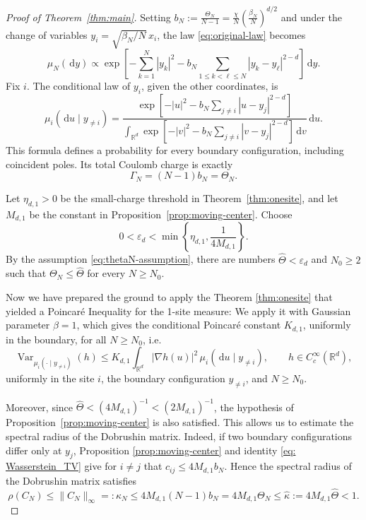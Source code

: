\documentclass[12pt,reqno,letterpaper]{amsart}
\theoremstyle{definition}
\theoremstyle{remark}
\numberwithin{equation}{section}
\newcommand{\R}{\mathbb R}
\newcommand{\dd}{\,\mathrm d}
\newcommand{\be}{\beta}
\newcommand{\Var}{\operatorname{Var}}
\begin{document}
\begin{proof}[Proof of Theorem~\ref{thm:main}]
Setting  $b_N:=\frac{\Theta_N}{N-1}
 =\frac{\chi}{N}\left(\frac{\be_N}{N}\right)^{d/2}$ and 
under the change of variables \(y_i=\sqrt{\be_N/N}\,x_i\), the law 
\eqref{eq:original-law} becomes
\[
 \mu_N(\dd y)
 \propto
 \exp\!\left[-\sum_{k=1}^N|y_k|^2
 -b_N\sum_{1\le k<\ell\le N}|y_k-y_\ell|^{2-d}\right]\dd y.
\]
Fix \(i\).  The conditional law of \(y_i\), given the other coordinates, is
\[
 \mu_i(\dd u\mid y_{\ne i})
 =\frac{\exp\!\left[-|u|^2-b_N\sum_{j\ne i}|u-y_j|^{2-d}\right]}
 {\displaystyle\int_{\R^d}
  \exp\!\left[-|v|^2-b_N\sum_{j\ne i}|v-y_j|^{2-d}\right]\dd v}\dd u.
\]
This formula defines a probability for every boundary configuration,
including coincident poles.  Its total Coulomb charge is exactly
\begin{equation}\label{eq:thetaN-total-charge}
 \Gamma_N=(N-1)b_N=\Theta_N.
\end{equation}

Let \(\eta_{d,1}>0\) be the small-charge threshold in
Theorem~\ref{thm:onesite}, and let \(M_{d,1}\) be the constant in
Proposition~\ref{prop:moving-center}.  Choose
\begin{equation}\label{eq:epsilon-d-choice}
 0<\varepsilon_d<
 \min\left\{\eta_{d,1},\frac{1}{4M_{d,1}}\right\}.
\end{equation}
By the assumption \eqref{eq:thetaN-assumption}, there are numbers
\(\widehat\Theta<\varepsilon_d\) and \(N_0\ge2\) such that
\(\Theta_N\le\widehat\Theta\) for every \(N\ge N_0\). 

Now we have prepared the ground to apply the Theorem
\ref{thm:onesite} that yielded a Poincar\'e Inequality for the 1-site measure: We apply it with Gaussian parameter \(\be=1\), which gives the
conditional Poincar\'e constant \(K_{d,1}\), uniformly in the boundary, for
all \(N\ge N_0\), i.e.
\[
 \Var_{\mu_i(\cdot\mid y_{\ne i})}(h) \leq
 K_{d,1}
 \int_{\R^d}|\nabla h(u)|^2\,
 \mu_i(\dd u\mid y_{\ne i}),
 \qquad h\in C_c^\infty(\R^d),
\]
uniformly in the site \(i\), the boundary configuration \(y_{\ne i}\),
and \(N\ge N_0\).

Moreover,  since
\(\widehat\Theta<(4M_{d,1})^{-1}<(2M_{d,1})^{-1}\), the hypothesis of
Proposition~\ref{prop:moving-center} is also satisfied. This allows us to estimate the spectral radius of the Dobrushin matrix. Indeed,  
if two boundary configurations differ only at \(y_j\), Proposition
\ref{prop:moving-center} and identity \eqref{eq: Wasserstein_TV} give for $i \neq j$ that $c_{ij}\le4M_{d,1}b_N.$
Hence the spectral radius of the Dobrushin matrix satisfies
\begin{equation}\label{eq:thetaN-dobrushin}
 \rho(C_N)\le\|C_N\|_\infty=:\kappa_N
 \le4M_{d,1}(N-1)b_N
 =4M_{d,1}\Theta_N
 \le\widehat\kappa:=4M_{d,1}\widehat\Theta<1.
\end{equation}


\end{proof}
\end{document}
